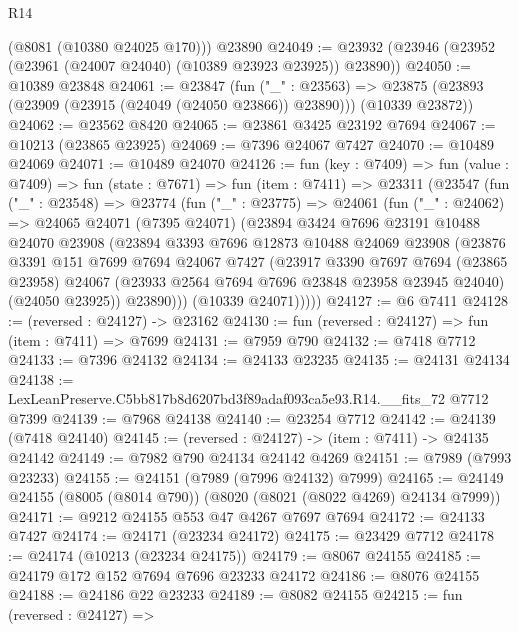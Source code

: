 \begin{lexlean}{R14}
\begin{coremodule}
      (@8081 (@10380 @24025 @170)))
    @23890
@24049 := @23932 (@23946 (@23952 (@23961 (@24007 @24040) (@10389 @23923 @23925)) @23890))
@24050 := @10389 @23848
@24061 := @23847
    (fun ("_" : @23563) =>
    @23875 (@23893 (@23909 (@23915 (@24049 (@24050 @23866)) @23890))) (@10339 @23872))
@24062 := @23562 @8420
@24065 := @23861 @3425 @23192 @7694
@24067 := @10213 (@23865 @23925)
@24069 := @7396 @24067 @7427
@24070 := @10489 @24069
@24071 := @10489 @24070
@24126 := fun (key : @7409) =>
  fun (value : @7409) =>
  fun (state : @7671) =>
  fun (item : @7411) =>
  @23311
    (@23547
      (fun ("_" : @23548) =>
      @23774
        (fun ("_" : @23775) =>
        @24061
          (fun ("_" : @24062) =>
          @24065
            @24071
            (@7395 @24071)
            (@23894
              @3424
              @7696
              @23191
              @10488
              @24070
              @23908
              (@23894
                @3393
                @7696
                @12873
                @10488
                @24069
                @23908
                (@23876
                  @3391
                  @151
                  @7699
                  @7694
                  @24067
                  @7427
                  (@23917
                    @3390
                    @7697
                    @7694
                    (@23865 @23958)
                    @24067
                    (@23933 @2564 @7694 @7696 @23848 @23958 @23945 @24040)
                    (@24050 @23925))
                  @23890)))
            (@10339 @24071)))))
@24127 := @6 @7411
@24128 := (reversed : @24127) -> @23162
@24130 := fun (reversed : @24127) => fun (item : @7411) => @7699
@24131 := @7959 @790
@24132 := @7418 @7712
@24133 := @7396 @24132
@24134 := @24133 @23235
@24135 := @24131 @24134
@24138 := LexLeanPreserve.C5bb817b8d6207bd3f89adaf093ca5e93.R14.__fits_72 @7712 @7399
@24139 := @7968 @24138
@24140 := @23254 @7712
@24142 := @24139 (@7418 @24140)
@24145 := (reversed : @24127) -> (item : @7411) -> @24135 @24142
@24149 := @7982 @790 @24134 @24142 @4269
@24151 := @7989 (@7993 @23233)
@24155 := @24151 (@7989 (@7996 @24132) @7999)
@24165 := @24149 @24155 (@8005 (@8014 @790)) (@8020 (@8021 (@8022 @4269) @24134 @7999))
@24171 := @9212 @24155 @553 @47 @4267 @7697 @7694
@24172 := @24133 @7427
@24174 := @24171 (@23234 @24172)
@24175 := @23429 @7712
@24178 := @24174 (@10213 (@23234 @24175))
@24179 := @8067 @24155
@24185 := @24179 @172 @152 @7694 @7696 @23233 @24172
@24186 := @8076 @24155
@24188 := @24186 @22 @23233
@24189 := @8082 @24155
@24215 := fun (reversed : @24127) =>

\end{coremodule}
\end{lexlean}
